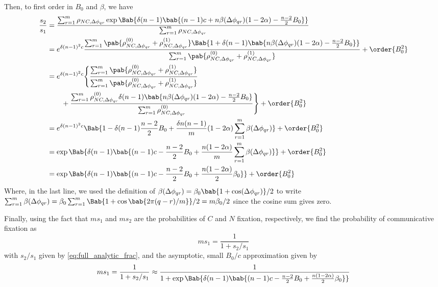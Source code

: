Then, to first order in $B_0$ and $\beta$,
we have
\begin{align*}
  \frac{s_2}{s_1}
  &=
  \frac
  {\sum_{r=1}^{m} \rho_{NC,\Delta \phi_{qr}}
    \exp \Bab{
      \delta (n-1)
      \bab{
        (n-1) c + n \beta(\Delta \phi_{qr}) (1 - 2 \alpha)
        - \frac{n-2}{2} B_0
      }
    }
  }
  {\sum_{r=1}^{m} \rho_{NC,\Delta \phi_{qr}}}
  \\
  &=
  e^{\delta (n-1)^2 c}
  \frac
  {\sum_{r=1}^{m}
    \pab{
      \rho_{NC,\Delta \phi_{qr}}^{(0)}
      +
      \rho_{NC,\Delta \phi_{qr}}^{(1)}
    }
    \Bab{1 +
      \delta (n-1)
      \bab{
        n \beta(\Delta \phi_{qr}) (1 - 2 \alpha)
        - \frac{n-2}{2} B_0
      }
    }
  }
  {\sum_{r=1}^{m} \pab{
    \rho_{NC,\Delta \phi_{qr}}^{(0)}
    +
    \rho_{NC,\Delta \phi_{qr}}^{(1)}
  }}
  + \order{B_0^2}
  \\
  &=
  e^{\delta (n-1)^2 c}
  \Biggl\{
  \frac
  {\sum_{r=1}^{m}
    \pab{
      \rho_{NC,\Delta \phi_{qr}}^{(0)}
      +
      \rho_{NC,\Delta \phi_{qr}}^{(1)}
    }
  }
  {\sum_{r=1}^{m} \pab{
    \rho_{NC,\Delta \phi_{qr}}^{(0)}
    +
    \rho_{NC,\Delta \phi_{qr}}^{(1)}
  }}
  \\
  &\qquad
  +
  \frac
  {\sum_{r=1}^{m} \rho_{NC,\Delta \phi_{qr}}^{(0)}
    \delta (n-1)
    \bab{
      n \beta(\Delta \phi_{qr}) (1 - 2 \alpha)
      - \frac{n-2}{2} B_0
    }
  }
  {\sum_{r=1}^{m} \rho_{NC,\Delta \phi_{qr}}^{(0)}
  }
  \Biggr\}
  + \order{B_0^2}
  \\
  &=
  e^{\delta (n-1)^2 c}
  \Bab{
    1
    - \delta (n-1) \frac{n-2}{2} B_0
    +
    \frac{\delta n (n-1)}{m} (1 - 2 \alpha)
    \sum_{r=1}^{m} \beta(\Delta \phi_{qr})
  }
  + \order{B_0^2}
  \\
  &=
  \exp \Bab{\delta (n-1) \bab{
    (n-1) c
    - \frac{n-2}{2} B_0
    +
    \frac{n (1 - 2 \alpha)}{m}
    \sum_{r=1}^{m} \beta(\Delta \phi_{qr})
  }}
  + \order{B_0^2}
  \\
  &=
  \exp \Bab{ \delta (n-1) \bab{
    (n-1) c
    - \frac{n-2}{2} B_0
    +
    \frac{n (1 - 2 \alpha)}{2} \beta_0
  }}
  + \order{B_0^2}
\end{align*}
Where, in the last line, we used
the definition of
$\beta(\Delta \phi_{qr}) = \beta_0 \bab{1 + \cos(\Delta \phi_{qr})}/2$
to write
$\sum_{r=1}^m \beta(\Delta \phi_{qr})
= \beta_0 \sum_{r=1}^m \Bab{1 + \cos\bab{2 \pi (q-r)/m}}/2
= m \beta_0/2$
since the cosine sum gives zero.

Finally, using the fact that $m s_1$ and $m s_2$
are the probabilities of $C$ and $N$ fixation, respectively,
we find the probability of communicative fixation as
\begin{equation}
  m s_1 = \frac{1}{1 + s_2/s_1}
  \label{eq:full_analytic}
\end{equation}
with $s_2/s_1$ given by \cref{eq:full_analytic_frac},
and the asymptotic, small $B_0/c$ approximation given by
\begin{equation}
  m s_1 = \frac{1}{1 + s_2/s_1}
  \approx
  \frac{1}
  {1 + \exp \Bab{\delta (n-1) \bab{
    (n-1) c
    - \frac{n-2}{2} B_0
    +
    \frac{n (1 - 2 \alpha)}{2} \beta_0
    }}
  }
  \label{eq:analytic_first_term}
\end{equation}

